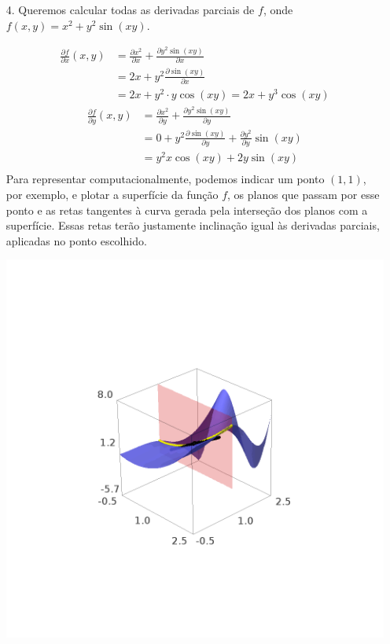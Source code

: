 \documentclass[../main.tex]{subfiles}
\begin{document}
		\begin{solucao}
			\begin{enumerate}[label=\arabic*.]
				\item[4.] Queremos calcular todas as derivadas parciais de $f$, onde $f(x,y)=x^2+y^2\sin(xy)$.
				
				\begin{align*}
					\frac{\partial f}{\partial x}(x,y)
					&=\frac{\partial x^2}{\partial x}+\frac{\partial y^2\sin(xy)}{\partial x}\\
					&=2x+y^2\frac{\partial \sin(xy)}{\partial x}\\
					&=2x+y^2\cdot y\cos(xy)=2x+y^3\cos(xy)
				\end{align*}
				\begin{align*}
					\frac{\partial f}{\partial y}(x,y)
					&=\frac{\partial x^2}{\partial y}+\frac{\partial y^2\sin(xy)}{\partial y}\\
					&=0+y^2\frac{\partial \sin(xy)}{\partial y}+\frac{\partial y^2}{\partial y}\sin(xy)\\
					&=y^2 x\cos(xy)+2y\sin(xy)\\
				\end{align*}
				Para representar computacionalmente, podemos indicar um ponto $(1,1)$, por exemplo, e plotar a superfície da função $f$, os planos que passam por esse ponto e as retas tangentes à curva gerada pela interseção dos planos com a superfície. Essas retas terão justamente inclinação igual às derivadas parciais, aplicadas no ponto escolhido.
				\begin{center}
					\begin{minipage}{0.45\textwidth}
						\centering
						\includegraphics[width=\textwidth]{imagens/lista04/picture_lista04.02_q01_item04.01.png}

\end{minipage}
\end{center}
\end{enumerate}
\end{solucao}
\end{document}
